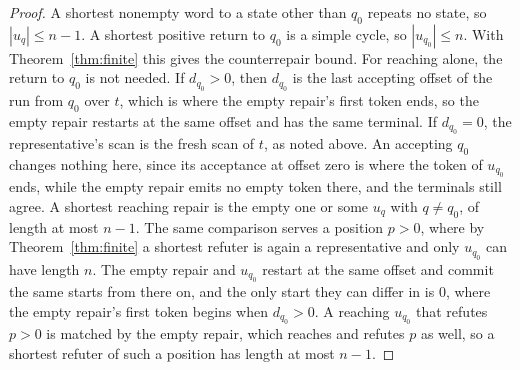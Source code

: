 \documentclass[11pt,a4paper]{article}
\theoremstyle{definition}
\theoremstyle{plain}
\theoremstyle{remark}
\begin{document}
\begin{proof}
A shortest nonempty word to a state other than $q_0$ repeats no state, so $|u_q| \le n - 1$. A shortest positive return
to $q_0$ is a simple cycle, so $|u_{q_0}| \le n$. With Theorem~\ref{thm:finite} this gives the counterrepair bound. For
reaching alone, the return to $q_0$ is not needed. If $d_{q_0} > 0$, then $d_{q_0}$ is the last accepting offset of the
run from $q_0$ over $t$, which is where the empty repair's first token ends, so the empty repair restarts at the same
offset and has the same terminal. If $d_{q_0} = 0$, the representative's scan is the fresh scan of $t$, as noted above.
An accepting $q_0$ changes nothing here, since its acceptance at offset zero is where the token of $u_{q_0}$ ends, while
the empty repair emits no empty token there, and the terminals still agree. A shortest reaching repair is the empty one
or some $u_q$ with $q \ne q_0$, of length at most $n - 1$. The same comparison serves a position $p > 0$, where by
Theorem~\ref{thm:finite} a shortest refuter is again a representative and only $u_{q_0}$ can have length $n$. The empty
repair and $u_{q_0}$ restart at the same offset and commit the same starts from there on, and the only start they can
differ in is $0$, where the empty repair's first token begins when $d_{q_0} > 0$. A reaching $u_{q_0}$ that refutes
$p > 0$ is matched by the empty repair, which reaches and refutes $p$ as well, so a shortest refuter of such a position
has length at most $n - 1$.


\end{proof}
\end{document}
